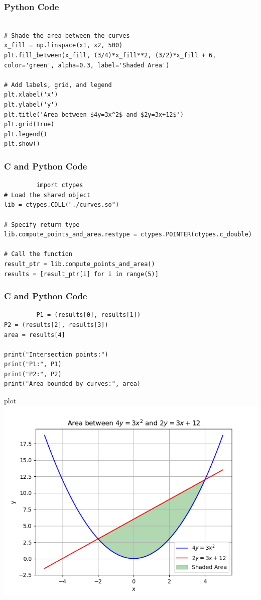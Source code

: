 \documentclass{beamer}
\begin{document}
 \begin{frame}[fragile]
 \frametitle{Python Code}
     \begin{lstlisting}
         
# Shade the area between the curves
x_fill = np.linspace(x1, x2, 500)
plt.fill_between(x_fill, (3/4)*x_fill**2, (3/2)*x_fill + 6, color='green', alpha=0.3, label='Shaded Area')

# Add labels, grid, and legend
plt.xlabel('x')
plt.ylabel('y')
plt.title('Area between $4y=3x^2$ and $2y=3x+12$')
plt.grid(True)
plt.legend()
plt.show()

     \end{lstlisting}
 \end{frame}
 \begin{frame}[fragile]
     \frametitle{C and Python Code}
     \begin{lstlisting}
         import ctypes
# Load the shared object
lib = ctypes.CDLL("./curves.so")

# Specify return type
lib.compute_points_and_area.restype = ctypes.POINTER(ctypes.c_double)

# Call the function
result_ptr = lib.compute_points_and_area()
results = [result_ptr[i] for i in range(5)]
     \end{lstlisting}
 \end{frame}
 \begin{frame}[fragile]
     \frametitle{C and Python Code}
     \begin{lstlisting}
         P1 = (results[0], results[1])
P2 = (results[2], results[3])
area = results[4]

print("Intersection points:")
print("P1:", P1)
print("P2:", P2)
print("Area bounded by curves:", area)

     \end{lstlisting}
 \end{frame}
\begin{frame}{plot}
     \centering
    \includegraphics[width=\columnwidth, height=0.8\textheight, keepaspectratio]{Figure_15.png} 
\end{frame}
\end{document}
